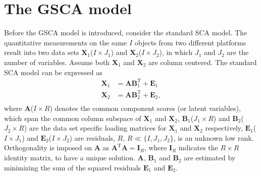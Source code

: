 \section{The GSCA model} \label{section:4.2}
Before the GSCA model is introduced, consider the standard SCA model. The quantitative measurements on the same $I$ objects from two different platforms result into two data sets $\mathbf{X}_1$($I\times J_1$) and $\mathbf{X}_2$($I\times J_2$), in which $J_1$ and $J_2$ are the number of variables. Assume both $\mathbf{X}_1$ and $\mathbf{X}_2$ are column centered. The standard SCA model can be expressed as
\begin{equation}\label{chapter4_eq:1}
\begin{aligned}
\mathbf{X}_1 &= \mathbf{AB}_1^{\text{T}} + \mathbf{E}_1\\
\mathbf{X}_2 &= \mathbf{AB}_2^{\text{T}} + \mathbf{E}_2,\\
\end{aligned}
\end{equation}
where $\mathbf{A}$($I\times R$) denotes the common component scores (or latent variables), which span the common column subspace of $\mathbf{X}_1$ and $\mathbf{X}_2$, $\mathbf{B}_1$($J_1\times R$) and $\mathbf{B}_2$($J_2\times R$) are the data set specific loading matrices for $\mathbf{X}_1$ and $\mathbf{X}_2$ respectively, $\mathbf{E}_1$($I\times J_1$) and $\mathbf{E}_2$($I\times J_2$) are residuals, $R$, $R \ll \{I,J_1,J_2\}$, is an unknown low rank. Orthogonality is imposed on $\mathbf{A}$ as $\mathbf{A}^{\text{T}}\mathbf{A}=\mathbf{I}_{R}$, where $\mathbf{I}_{R}$ indicates the $R\times R$ identity matrix, to have a unique solution. $\mathbf{A}$, $\mathbf{B}_1$ and $\mathbf{B}_2$ are estimated by minimizing the sum of the squared residuals $\mathbf{E}_1$ and $\mathbf{E}_2$.

